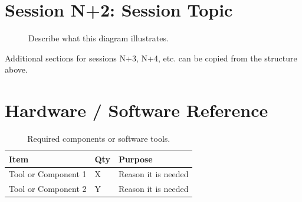 \documentclass[11pt,letterpaper]{article}
\begin{document}
	\newpage
	\section{Session N+2: Session Topic}
	\label{sec:session2}
	
	\begin{figure}[ht!]
		\centering
		\caption{Describe what this diagram illustrates.}
		\label{fig:example_diagram}
	\end{figure}
	
	Additional sections for sessions N+3, N+4, etc. can be copied from the structure above.
	
	\newpage
	\section{Hardware / Software Reference}
	\label{sec:resources}
	
	\begin{table}[ht!]
		\centering
		\caption{Required components or software tools.}
		\label{tab:hardware}
		\renewcommand{\arraystretch}{1.3}
		\begin{tabularx}{\textwidth}{l l X}
			\toprule
			\textbf{Item} & \textbf{Qty} & \textbf{Purpose} \\
			\midrule
			Tool or Component 1 & X & Reason it is needed \\
			Tool or Component 2 & Y & Reason it is needed \\
			\bottomrule
		\end{tabularx}
	\end{table}
	
\end{document}
